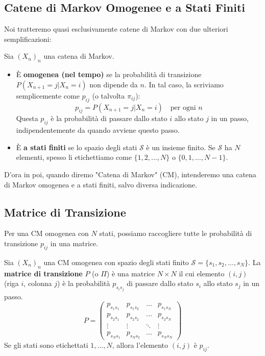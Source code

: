 \subsection{Catene di Markov Omogenee e a Stati Finiti}
Noi tratteremo quasi esclusivamente catene di Markov con due ulteriori semplificazioni:
\begin{definition}
Sia $(X_n)_n$ una catena di Markov.
\begin{itemize}
    \item È \textbf{omogenea (nel tempo)} se la probabilità di transizione $P(X_{n+1}=j | X_n=i)$ non dipende da $n$. In tal caso, la scriviamo semplicemente come $p_{ij}$ (o talvolta $\pi_{ij}$):
    \begin{equation}
        p_{ij} = P(X_{n+1}=j | X_n=i) \quad \text{per ogni } n
    \end{equation}
    Questa $p_{ij}$ è la probabilità di passare dallo stato $i$ allo stato $j$ in un passo, indipendentemente da quando avviene questo passo.
    \item È \textbf{a stati finiti} se lo spazio degli stati $\mathcal{S}$ è un insieme finito. Se $\mathcal{S}$ ha $N$ elementi, spesso li etichettiamo come $\{1, 2, \dots, N\}$ o $\{0, 1, \dots, N-1\}$.
\end{itemize}
D'ora in poi, quando diremo "Catena di Markov" (CM), intenderemo una catena di Markov omogenea e a stati finiti, salvo diversa indicazione.
\end{definition}

\subsection{Matrice di Transizione}
Per una CM omogenea con $N$ stati, possiamo raccogliere tutte le probabilità di transizione $p_{ij}$ in una matrice.

\begin{definition}
Sia $(X_n)_n$ una CM omogenea con spazio degli stati finito $\mathcal{S}=\{s_1, s_2, \dots, s_N\}$. La \textbf{matrice di transizione} $P$ (o $\Pi$) è una matrice $N \times N$ il cui elemento $(i,j)$ (riga $i$, colonna $j$) è la probabilità $p_{s_i s_j}$ di passare dallo stato $s_i$ allo stato $s_j$ in un passo.
\begin{equation}
    P = \begin{pmatrix}
        p_{s_1 s_1} & p_{s_1 s_2} & \dots & p_{s_1 s_N} \\
        p_{s_2 s_1} & p_{s_2 s_2} & \dots & p_{s_2 s_N} \\
        \vdots & \vdots & \ddots & \vdots \\
        p_{s_N s_1} & p_{s_N s_2} & \dots & p_{s_N s_N}
    \end{pmatrix}
\end{equation}
Se gli stati sono etichettati $1, \dots, N$, allora l'elemento $(i,j)$ è $p_{ij}$.
\end{definition}

